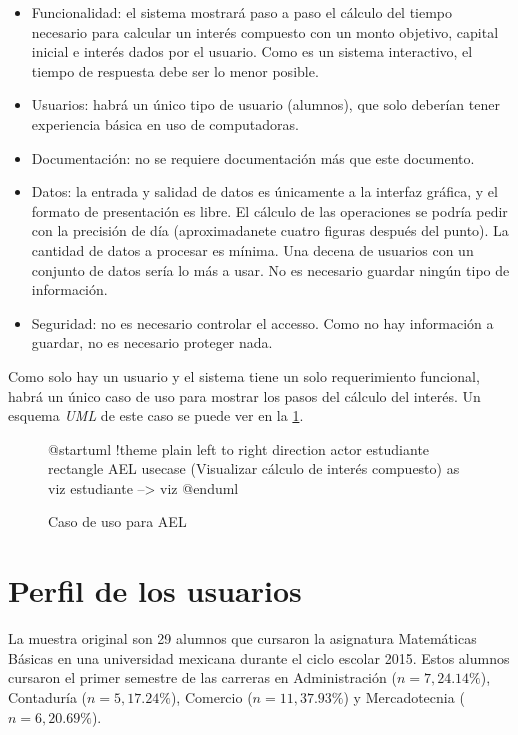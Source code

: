 \documentclass[titlepage]{article}
\begin{document}
\begin{itemize}
  \item Funcionalidad: el sistema mostrará paso a paso el cálculo del tiempo
        necesario para calcular un interés compuesto con un monto objetivo,
        capital inicial e interés dados por el usuario. Como es un sistema
        interactivo, el tiempo de respuesta debe ser lo menor posible.
  \item Usuarios: habrá un único tipo de usuario (alumnos), que solo deberían
        tener experiencia básica en uso de computadoras.
  \item Documentación: no se requiere documentación más que este documento.
  \item Datos: la entrada y salidad de datos es únicamente a la interfaz
        gráfica, y el formato de presentación es libre. El cálculo de las
        operaciones se podría pedir con la precisión de día (aproximadanete
        cuatro figuras después del punto). La cantidad de datos a procesar es
        mínima. Una decena de usuarios con un conjunto de datos sería lo más a
        usar. No es necesario guardar ningún tipo de información.
  \item Seguridad: no es necesario controlar el accesso. Como no hay información
        a guardar, no es necesario proteger nada.
\end{itemize}

Como solo hay un usuario y el sistema tiene un solo requerimiento funcional,
habrá un único caso de uso para mostrar los pasos del cálculo del interés. Un
esquema \emph{UML} de este caso se puede ver en la \cref{uml:ael-usecase}.

\begin{figure}
  \centering
  \begin{plantuml}
    @startuml
    !theme plain
    left to right direction
    actor estudiante
    rectangle AEL {
      usecase (Visualizar cálculo de interés compuesto) as viz
    }
    estudiante --> viz
    @enduml
  \end{plantuml}
  \caption{Caso de uso para AEL}
  \label{uml:ael-usecase}
\end{figure}

\section{Perfil de los usuarios}
La muestra original son 29 alumnos que cursaron la asignatura Matemáticas
Básicas en una universidad mexicana durante el ciclo escolar 2015. Estos alumnos
cursaron el primer semestre de las carreras en Administración ($n=7, 24.14\%$),
Contaduría ($n=5, 17.24\%$), Comercio ($n=11, 37.93\%$) y Mercadotecnia ($n=6,
20.69\%$).
\end{document}
